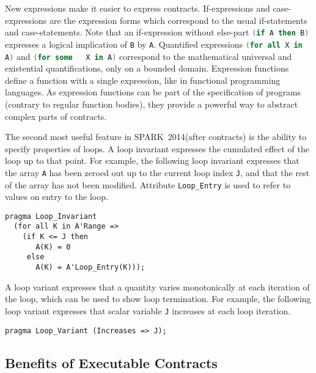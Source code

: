 \documentclass[10pt,a4paper,twocolumn]{article}
\newcommand{\newspark}{SPARK~2014\xspace}
\newcommand{\SPARK}[1]{\lstinline[language=Ada,basicstyle={\footnotesize
      \sffamily},framesep=0pt]$#1$}
\begin{document}

New expressions make it easier to express contracts. If-expressions and
case-expressions are the expression forms which correspond to the usual
if-statements and case-statements. Note that an if-expression without else-part
\SPARK{(if A then B)} expresses a logical implication of \SPARK{B} by
\SPARK{A}. Quantified expressions \SPARK{(for all X in A)} and \SPARK{(for some
  X in A)} correspond to the mathematical universal and existential
quantifications, only on a bounded domain. Expression functions define a
function with a single expression, like in functional programming languages. As
expression functions can be part of the specification of programs (contrary to
regular function bodies), they provide a powerful way to abstract complex parts
of contracts.

The second most useful feature in \newspark (after contracts) is the ability to
specify properties of loops. A loop invariant expresses the cumulated effect
of the loop up to that point. For example, the following loop invariant
expresses that the array \SPARK{A} has been zeroed out up to the current loop
index \SPARK{J}, and that the rest of the array has not been modified.
Attribute \SPARK{Loop_Entry} is used to refer to values on entry to the loop.

\begin{lstlisting}
pragma Loop_Invariant
  (for all K in A'Range =>
    (if K <= J then
       A(K) = 0
     else
       A(K) = A'Loop_Entry(K)));
\end{lstlisting}

A loop variant expresses that a quantity varies monotonically at each iteration
of the loop, which can be used to show loop termination. For example, the
following loop variant expresses that scalar variable \SPARK{J} increases at
each loop iteration.

\begin{lstlisting}
pragma Loop_Variant (Increases => J);
\end{lstlisting}

\subsection{Benefits of Executable Contracts}
\label{subsec:ExecutableContracts}
\end{document}
